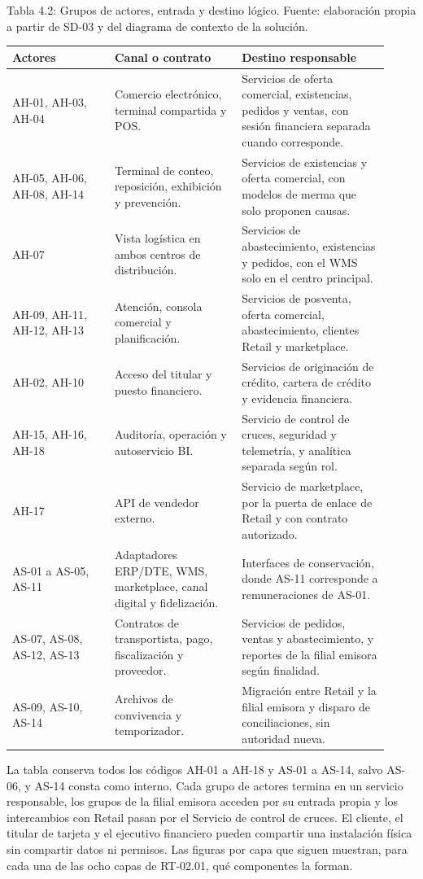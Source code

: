 \documentclass[11pt]{article}
\begin{document}
Tabla 4.2: Grupos de actores, entrada y destino lógico. Fuente: elaboración propia a partir de SD-03 y del diagrama de contexto de la solución.\par\nopagebreak
\begin{longtable}{@{}p{0.25\linewidth}p{0.31\linewidth}p{0.36\linewidth}@{}}
\toprule Actores & Canal o contrato & Destino responsable \\
\midrule\endhead\bottomrule\endlastfoot
AH-01, AH-03, AH-04 & Comercio electrónico, terminal compartida y POS. & Servicios de oferta comercial, existencias, pedidos y ventas, con sesión financiera separada cuando corresponde. \\
AH-05, AH-06, AH-08, AH-14 & Terminal de conteo, reposición, exhibición y prevención. & Servicios de existencias y oferta comercial, con modelos de merma que solo proponen causas. \\
AH-07 & Vista logística en ambos centros de distribución. & Servicios de abastecimiento, existencias y pedidos, con el WMS solo en el centro principal. \\
AH-09, AH-11, AH-12, AH-13 & Atención, consola comercial y planificación. & Servicios de posventa, oferta comercial, abastecimiento, clientes Retail y marketplace. \\
AH-02, AH-10 & Acceso del titular y puesto financiero. & Servicios de originación de crédito, cartera de crédito y evidencia financiera. \\
AH-15, AH-16, AH-18 & Auditoría, operación y autoservicio BI. & Servicio de control de cruces, seguridad y telemetría, y analítica separada según rol. \\
AH-17 & API de vendedor externo. & Servicio de marketplace, por la puerta de enlace de Retail y con contrato autorizado. \\
AS-01 a AS-05, AS-11 & Adaptadores ERP/DTE, WMS, marketplace, canal digital y fidelización. & Interfaces de conservación, donde AS-11 corresponde a remuneraciones de AS-01. \\
AS-07, AS-08, AS-12, AS-13 & Contratos de transportista, pago, fiscalización y proveedor. & Servicios de pedidos, ventas y abastecimiento, y reportes de la filial emisora según finalidad. \\
AS-09, AS-10, AS-14 & Archivos de convivencia y temporizador. & Migración entre Retail y la filial emisora y disparo de conciliaciones, sin autoridad nueva. \\
\end{longtable}

La tabla conserva todos los códigos AH-01 a AH-18 y AS-01 a AS-14, salvo AS-06, y AS-14 consta como interno. Cada grupo de actores termina en un servicio responsable, los grupos de la filial emisora acceden por su entrada propia y los intercambios con Retail pasan por el Servicio de control de cruces. El cliente, el titular de tarjeta y el ejecutivo financiero pueden compartir una instalación física sin compartir datos ni permisos. Las figuras por capa que siguen muestran, para cada una de las ocho capas de RT-02.01, qué componentes la forman.
\end{document}

